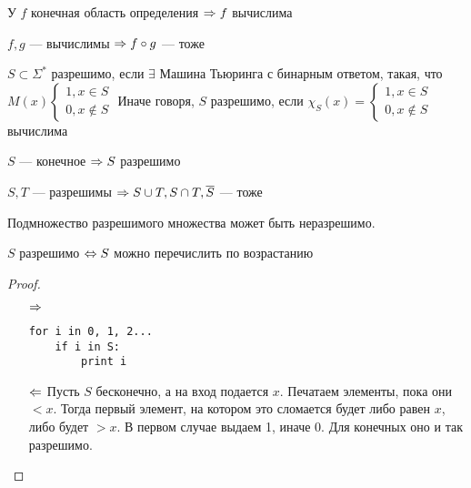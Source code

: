 \begin{proposition}
    У \(f\) конечная область определения \(\Rightarrow f\) вычислима
\end{proposition}
\begin{proposition}
    \(f, g\) --- вычислимы \(\Rightarrow f\circ g\) --- тоже
\end{proposition}

\begin{definition}
    \(S \subset \Sigma^*\) разрешимо, если \(\exists\) Машина Тьюринга с бинарным ответом, такая, что \(M(x) \left\{\begin{array}{l}
        1, x \in S \\
        0, x \notin S
    \end{array}\right.\)
    Иначе говоря, \(S\) разрешимо, если \(\chi_S(x) = \left\{\begin{array}{l}
        1, x \in S \\
        0, x \notin S
    \end{array}\right.\) вычислима
\end{definition}

\begin{proposition}
    \(S\) --- конечное \(\Rightarrow S\) разрешимо
\end{proposition}
\begin{proposition}
    \(S, T\) --- разрешимы \(\Rightarrow S\cup T, S \cap T,\overline{S}\) --- тоже
\end{proposition}

\begin{note}
    Подмножество разрешимого множества может быть неразрешимо.
\end{note}

\begin{theorem}
    \(S\) разрешимо \(\Leftrightarrow S\) можно перечислить по возрастанию
\end{theorem}
\begin{proof}\indent
    \begin{enumerate}
        \item[\(\Rightarrow\)] 
        \begin{verbatim}
for i in 0, 1, 2...
    if i in S:
        print i
        \end{verbatim}
        \item[\(\Leftarrow\)] Пусть \(S\) бесконечно, а на вход подается \(x\). Печатаем элементы, пока они \(< x\). Тогда первый элемент, на котором это сломается будет либо равен \(x\), либо будет \(> x\). В первом случае выдаем 1, иначе 0. Для конечных оно и так разрешимо.
    \end{enumerate}
\end{proof}

